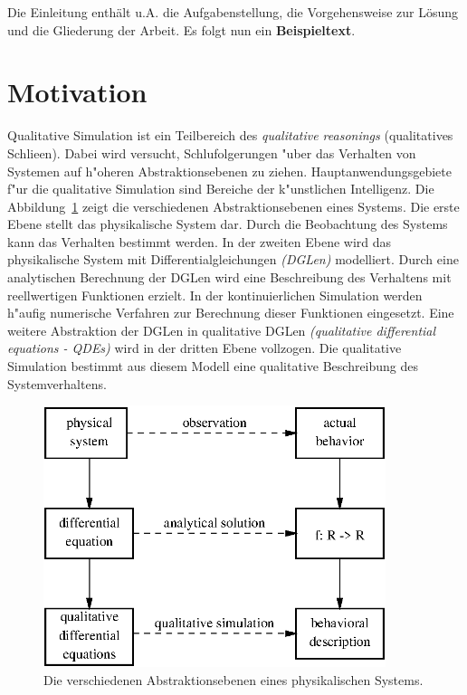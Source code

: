 \documentclass[11pt]{report}
\begin{document}
Die Einleitung enth\"{a}lt u.A. die Aufgabenstellung, die Vorgehensweise zur
L\"{o}sung und die Gliederung der Arbeit.  Es folgt nun ein {\bf Beispieltext}.

\section{Motivation}

Qualitative Simulation ist ein Teilbereich des {\em qualitative reasonings} 
(qualitatives Schlie\3en). Dabei wird versucht, Schlu\3folgerungen "uber 
das Verhalten von Systemen auf h"oheren Abstraktionsebenen zu ziehen.
Hauptanwendungsgebiete f"ur die qualitative Simulation sind Bereiche der 
k"unstlichen Intelligenz. 
Die Abbildung~\ref{fig_abstraktion} zeigt die verschiedenen Abstraktionsebenen eines 
Systems.  Die erste Ebene stellt das physikalische System dar. 
Durch die Beobachtung des Systems kann das Verhalten bestimmt werden.
In der zweiten Ebene wird das physikalische System mit 
Differentialgleichungen {\em (DGLen)} modelliert.  Durch eine analytischen 
Berechnung der DGLen wird eine Beschreibung des Verhaltens mit 
reell\-wertigen Funktionen erzielt.  In der kontinuierlichen Simulation 
werden h"aufig numerische Verfahren zur Berechnung dieser Funktionen 
eingesetzt.  Eine weitere Abstraktion der DGLen in qualitative DGLen 
{\em (qualitative differential equations - QDEs)} wird in der dritten Ebene 
vollzogen.  Die qualitative Simulation bestimmt aus diesem Modell eine 
qualitative Beschreibung des Systemverhaltens. 

\begin{figure} %
\centerline{\includegraphics[width=10cm,keepaspectratio=true]{qdeode}}
\caption[Abstraktionsebenen eines physikalischen Sy\-stems.]
{Die verschiedenen Abstraktionsebenen eines physikalischen Sy\-stems.}
\label{fig_abstraktion}
\end{figure}
\end{document}
